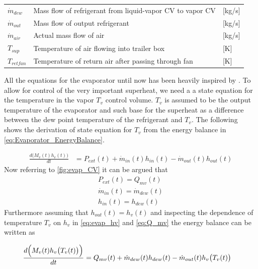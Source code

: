 \begin{center}
\begin{tabular}{l p{10cm} l}
		$\dot{m}_{dew} $ & Mass flow of refrigerant from liquid-vapor CV to vapor CV                & [\si{kg}/\si{s}]                  \\
		$\dot{m}_{out} $ & Mass flow of output refrigerant                                          & [\si{kg}/\si{s}]                  \\
		$\dot{m}_{air}$  & Actual mass flow of air                                                  & [\si{kg}/\si{s}]                  \\
		$T_{sup} $       & Temperature of air flowing into trailer box                              & [\si{K}]                          \\
		$T_{retfan}$     & Temperature of return air after passing through fan                      & [\si{K}]
	\end{tabular}
\end{center}

All the equations for the evaporator until now has been heavily inspired by \cite{Sorensen2013}. To allow for control of the very important superheat, we need a a state equation for the temperature in the vapor $ T_v $ control volume. $ T_v $ is assumed to be the output temperature of the evaporator and such base for the superheat as a difference between the dew point temperature of the refrigerant and $ T_v $. The following shows the derivation of state equation for $ T_v $ from the energy balance in \cref{eq:Evaporator_EnergyBalance}.

\begin{align}
	\frac{ d\bigl(M_{v}(t) h_v(t) \bigr)}{dt} & = P_{ext}(t) + \dot{m}_{in}(t)h_{in}(t) - \dot{m}_{out}(t)h_{out}(t) 		\label{eq:Evaporator_EnergyBalance}
\end{align}
Now referring to \cref{fig:evap_CV} it can be argued that
\begin{align}
	P_{ext}(t) = Q_{mv}(t) \\
	\dot{m}_{in}(t) = \dot{m}_{dew}(t)\\
	h_{in}(t) = h_{dew}(t)
\end{align}
Furthermore assuming that $ h_{out}(t) = h_v(t) $ and inspecting the dependence of temperature $T_v$ on $ h_v $ in \cref{eq:evap_hv} and \cref{eq:Q_mv}
the energy balance can be written as

\begin{align}
	\frac{ d\Bigl(M_{v}(t) h_v \bigl(T_v(t)\bigr) \Bigr)}{dt} & = Q_{mv}(t) + \dot{m}_{dew}(t)h_{dew}(t) - \dot{m}_{out}(t)h_v\bigl(T_v(t)\bigr)		\label{eq:Evaporator_EnergyBalance2}
\end{align}

